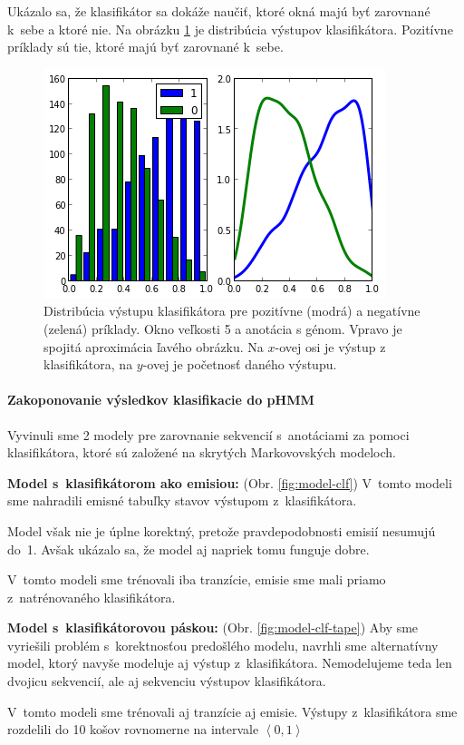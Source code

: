 \documentclass{svk_short_sk}
\begin{document}
Ukázalo sa, že klasifikátor sa dokáže naučiť, ktoré okná majú byť zarovnané k~sebe a ktoré nie. Na obrázku \ref{fig:clf-m-dist} je distribúcia výstupov klasifikátora. Pozitívne príklady sú tie, ktoré majú byť zarovnané k~sebe.

\begin{figure}[H]
    \centering
    \includegraphics[width=.3\textwidth, clip=true]{images/clf_m_test}
    \caption{Distribúcia výstupu klasifikátora pre pozitívne (modrá) a negatívne (zelená) príklady.  Okno veľkosti 5 a anotácia s génom.
    Vpravo je spojitá aproximácia ľavého obrázku. Na $x$-ovej osi je výstup z klasifikátora, na $y$-ovej je početnosť daného výstupu.}
    \label{fig:clf-m-dist}
\end{figure}

\paragraph{Zakoponovanie výsledkov klasifikacie do pHMM}

Vyvinuli sme 2 modely pre zarovnanie sekvencií s~anotáciami za pomoci klasifikátora, ktoré sú založené na skrytých Markovovských modeloch.

\textbf{Model s~klasifikátorom ako emisiou:} (Obr. \ref{fig:model-clf})
V~tomto modeli sme nahradili emisné tabuľky stavov výstupom z~klasifikátora.

Model však nie je úplne korektný, pretože pravdepodobnosti emisií nesumujú do~1. Avšak ukázalo sa, že model aj napriek tomu funguje dobre.

V~tomto modeli sme trénovali iba tranzície, emisie sme mali priamo z~natrénovaného klasifikátora.

\textbf{Model s~klasifikátorovou páskou:} (Obr. \ref{fig:model-clf-tape})
Aby sme vyriešili problém s~korektnosťou predošlého modelu, navrhli sme alternatívny model, ktorý navyše modeluje aj výstup z~klasifikátora.
Nemodelujeme teda len dvojicu sekvencií, ale aj sekvenciu výstupov klasifikátora.

V~tomto modeli sme trénovali aj tranzície aj emisie. Výstupy z~klasifikátora sme rozdelili do 10 košov rovnomerne na intervale $\left<0, 1\right>$
\end{document}
